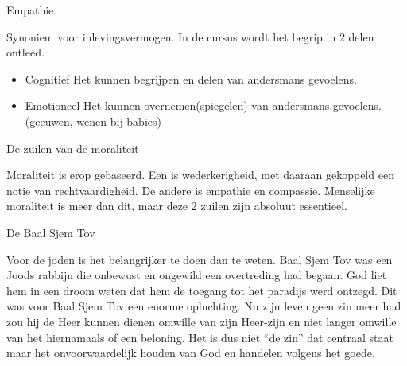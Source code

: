 \documentclass[main.tex]{subfiles}
\begin{document}
\begin{examenvraag}
    \begin{vraag}
        Empathie
    \end{vraag}

    \begin{antwoord}
        Synoniem voor inlevingsvermogen.
        In de cursus wordt het begrip in 2 delen ontleed.
        \begin{itemize}
            \item Cognitief
                Het kunnen begrijpen en delen van andersmans gevoelens.
            \item Emotioneel
                Het kunnen overnemen(spiegelen) van andersmans gevoelens. (geeuwen, wenen bij babies)
        \end{itemize}
    \end{antwoord}
\end{examenvraag}


\begin{examenvraag}
    \begin{vraag}
        De zuilen van de moraliteit
    \end{vraag}

    \begin{antwoord}
        Moraliteit is erop gebaseerd.
        Een is wederkerigheid, met daaraan gekoppeld een notie van rechtvaardigheid. 
        De andere is empathie en compassie. 
        Menselijke moraliteit is meer dan dit, maar deze 2 zuilen zijn absoluut essentieel.
    \end{antwoord}
\end{examenvraag}


\begin{examenvraag}
    \begin{vraag}
        De Baal Sjem Tov
    \end{vraag}

    \begin{antwoord}
        Voor de joden is het belangrijker te doen dan te weten.‭
	‬Baal Sjem Tov was een Joods rabbijn die‭ ‬onbewust en ongewild een overtreding had begaan.‭ ‬God liet hem in een droom weten dat‭ 
        ‬hem de toegang tot het paradijs werd ontzegd.‭ ‬Dit was voor Baal Sjem Tov een enorme 
        opluchting.‭ ‬Nu zijn leven geen zin meer had zou hij de Heer kunnen dienen omwille van zijn 
        Heer-zijn en niet langer omwille van het hiernamaals of een beloning.‭ ‬Het is dus‭ ‬niet‭ “‬de 
        zin‭”‬ dat centraal staat maar het onvoorwaardelijk houden van God en handelen volgens het 
        goede.
    \end{antwoord}
\end{examenvraag}
\end{document}
